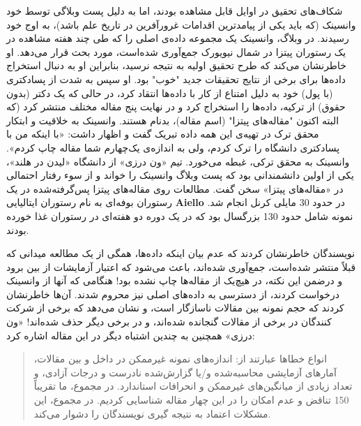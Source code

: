 شکاف‌های تحقیق در اوایل قابل مشاهده بودند، اما به دلیل پست وبلاگی توسط خود وانسینک (که باید یکی از پیامدترین اقدامات غرورآفرین در تاریخ علم باشد)، به اوج خود رسیدند.
در وبلاگ، وانسینک یک مجموعه داده‌ی اصلی را که طی چند هفته مشاهده در یک رستوران پیتزا در شمال نیویورک جمع‌آوری شده‌است، مورد بحث قرار می‌دهد.
او خاطرنشان می‌کند که طرح تحقیق اولیه به نتیجه نرسید، بنابراین او به دنبال استخراج داده‌ها برای برخی از نتایج تحقیقات جدید "خوب" بود.
او سپس به شدت از پسادکتری (با پول) خود به دلیل امتناع از کار با داده‌ها انتقاد کرد، در حالی که یک دکتر (بدون حقوق) از ترکیه، داده‌ها را استخراج کرد و در نهایت پنج مقاله مختلف منتشر کرد (که البته اکنون "مقاله‌های پیتزا" (اسم مقاله)، بدنام هستند.
وانسینک به خلاقیت و ابتکار محقق ترک در تهیه‌ی این همه داده تبریک گفت و اظهار داشت: «با اینکه من با پسادکتری دانشگاه را ترک کردم، ولی به اندازه‌ی یک‌چهارم شما مقاله چاپ کردم».
وانسینک به محقق ترکی، غبطه می‌خورد.
تیم «ون درزی» از دانشگاه «لیدن در هلند»، یکی از اولین دانشمندانی بود که پست وبلاگ وانسینک را خواند و از سوء رفتار احتمالی در «مقاله‌های پیتزا» سخن گفت.
مطالعات روی مقاله‌های پیتزا پس‌گرفته‌شده در یک رستوران بوفه‌ای به نام رستوران ایتالیایی \textenglish{\textbf{Aiello}} در حدود 30 مایلی کرنل انجام شد.
نمونه شامل حدود 130 بزرگسال بود که در یک دوره دو هفته‌ای در رستوران غذا خورده بودند.

نویسندگان خاطرنشان کردند که عدم بیان اینکه داده‌ها، همگی از یک مطالعه میدانی که قبلاً منتشر شده‌است، جمع‌آوری شده‌اند، باعث می‌شود که اعتبار آزمایشات از بین برود و درضمن این نکته، در هیچ‌یک از مقاله‌ها چاپ نشده بود!
هنگامی که آنها از وانسینک درخواست کردند، از دسترسی به داده‌های اصلی نیز محروم شدند.
آن‌ها خاطرنشان کردند که حجم نمونه بین مقالات ناسازگار است، و نشان می‌دهد که برخی از شرکت کنندگان در برخی از مقالات گنجانده شده‌اند، و در برخی دیگر حذف شده‌اند!
«ون درزی» همچنین به چندین اشتباه دیگر در این مقاله اشاره کرد:

\begin{quote}
    انواع خطاها عبارتند از: اندازه‌های نمونه غیرممکن در داخل و بین مقالات، آمارهای آزمایشی محاسبه‌شده و/یا گزارش‌شده نادرست و درجات آزادی، و تعداد زیادی از میانگین‌های غیرممکن و انحرافات استاندارد.
    در مجموع، ما تقریباً 150 تناقض و عدم امکان را در این چهار مقاله شناسایی کردیم.
    در مجموع، این مشکلات اعتماد به نتیجه گیری نویسندگان را دشوار می‌کند.
\end{quote}

